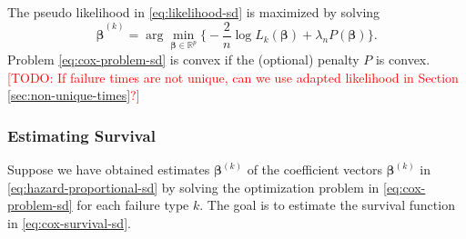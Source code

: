 \documentclass[11pt]{article}
\newcommand{\R}{\mathbb{R}}
\renewcommand{\b}{\bm{\beta}}
\begin{document}
The pseudo likelihood in \eqref{eq:likelihood-sd} is maximized by solving 
\begin{equation} \label{eq:cox-problem-sd}
	\widehat{\b}^{(k)} = \arg\min_{\b\in\R^p} 
	\bigg\{ 
		-\frac{2}{n} \log L_k(\b) + \lambda_n P(\b)
	\bigg\}.
\end{equation}
Problem \eqref{eq:cox-problem-sd} is convex if the (optional) penalty $P$ is convex. 
\textcolor{red}{[TODO: If failure times are not unique, can we use adapted likelihood in Section \ref{sec:non-unique-times}?]}

\subsubsection{Estimating Survival}
Suppose we have obtained estimates $\b^{(k)}$ of the coefficient vectors $\b^{(k)}$ in \eqref{eq:hazard-proportional-sd} by solving the optimization problem in \eqref{eq:cox-problem-sd} for each failure type $k$. The goal is to estimate the survival function in \eqref{eq:cox-survival-sd}.
\end{document}
